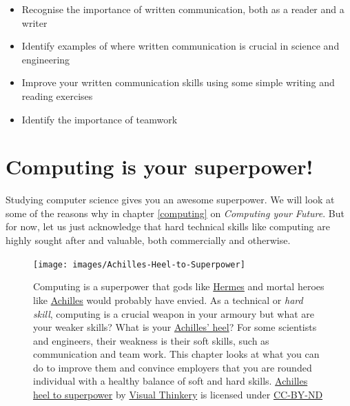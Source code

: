 \documentclass[
]{book}
\providecommand{\tightlist}{%
  \setlength{\itemsep}{0pt}\setlength{\parskip}{0pt}}
\begin{document}
\begin{itemize}
\tightlist
\item
  Recognise the importance of written communication, both as a reader and a writer
\item
  Identify examples of where written communication is crucial in science and engineering
\item
  Improve your written communication skills using some simple writing and reading exercises
\item
  Identify the importance of teamwork
\end{itemize}

\hypertarget{superpower}{%
\section{Computing is your superpower!}\label{superpower}}

Studying computer science gives you an awesome superpower. We will look at some of the reasons why in chapter \ref{computing} on \emph{Computing your Future}. But for now, let us just acknowledge that hard technical skills like computing are highly sought after and valuable, both commercially and otherwise.

\begin{figure}

{\centering \texttt{[image: images/Achilles-Heel-to-Superpower]} 

}

\caption{Computing is a superpower that gods like \href{https://en.wikipedia.org/wiki/Hermes}{Hermes} and mortal heroes like \href{https://en.wikipedia.org/wiki/Achilles}{Achilles} would probably have envied. \citep{heroes} As a technical or \emph{hard skill}, computing is a crucial weapon in your armoury but what are your weaker skills? What is your \href{https://en.wikipedia.org/wiki/Achilles\%27_heel}{Achilles' heel}? For some scientists and engineers, their weakness is their soft skills, such as communication and team work. This chapter looks at what you can do to improve them and convince employers that you are rounded individual with a healthy balance of soft and hard skills. \href{https://bryanmmathers.com/achilles-heel-to-superpower/}{Achilles heel to superpower} by \href{https://visualthinkery.com}{Visual Thinkery} is licensed under \href{https://creativecommons.org/licenses/by-nd/4.0/}{CC-BY-ND}}\label{fig:achilles-fig}
\end{figure}
\end{document}
